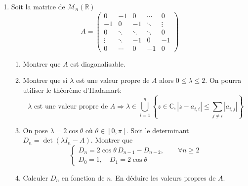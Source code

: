 \documentclass{article}[11pt]
\begin{document}
\begin{enumerate}
%

\item Soit la matrice de  $\mathcal{M}_n(\mathbb{R})$ 
\[A=
\left(\begin{array}{ccccc}
0&-1&0&\cdots&0\\
-1&0&-1&\ddots&\vdots\\
0&  \ddots &\ddots&\ddots&0\\
\vdots &\ddots &-1&0&-1\\
   0&\cdots &0&-1 &0
\end{array}\right)
\] 
\begin{enumerate}
\item Montrer que $A$ est diagonalisable.
\item Montrer que si $\lambda$ est une valeur propre de $A$ alors $0\leq \lambda\leq 2$. On pourra utiliser le théorème d'Hadamart:
\[\lambda \mbox{ est une valeur propre de } A \Longrightarrow \lambda\in \bigcup_{i=1}^n \left\{z\in \mathbb{C}, |z-a_{i,i}|\leq\sum_{j\neq i}|a_{i,j}|\right\}\]
\item On pose $\lambda=2\cos\theta$ où $\theta\in[0,\pi]$. Soit le determinant  $D_n=\det(\lambda I_n-A)$. Montrer que 
\[\left\{\begin{array}{l}
D_n=2\cos\theta \, D_{n-1}-D_{n-2}, \qquad\forall n\geq 2\\
D_0=1,\quad D_1=2\cos\theta
\end{array}\right.\]

\item Calculer $D_n$ en fonction de $n$. En déduire les valeurs propres de $A$.
\end{enumerate}

\end{enumerate}
\end{document}
